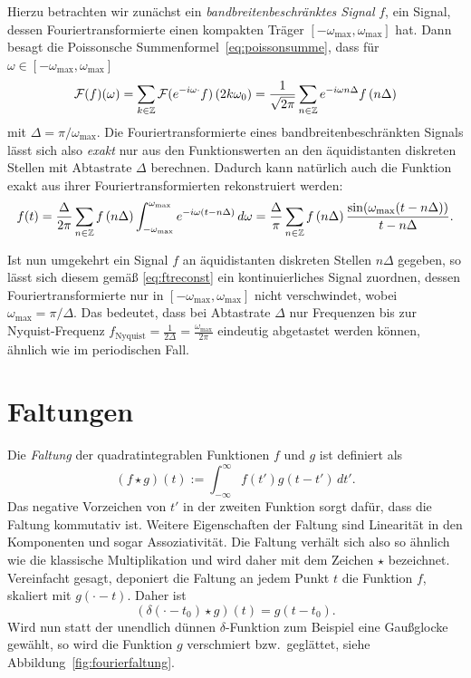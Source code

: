 Hierzu betrachten wir zunächst ein \emph{bandbreitenbeschränktes
  Signal} $f$, \dh ein Signal, dessen Fouriertransformierte einen
kompakten Träger $[-\omega_\text{max},\omega_\text{max}]$ hat. Dann besagt die
Poissonsche Summenformel~\eqref{eq:poissonsumme}, dass für
$\omega\in[-\omega_\text{max},\omega_\text{max}]$
\begin{equation}
  \mathcal F(f)(\omega) =
  \sum_{k\in\mathbb{Z}}\mathcal F(e^{-i\omega \cdot} f)\left(2k\omega_0\right)
  =
  \frac{1}{\sqrt{2\pi}}
  \sum_{n\in\mathbb{Z}} e^{-i \omega n \Delta}f\left(n \Delta\right)
\end{equation}
mit $\Delta=\pi/\omega_\text{max}$. Die Fouriertransformierte eines
bandbreitenbeschränkten Signals lässt sich also \emph{exakt} nur aus
den Funktionswerten an den äquidistanten diskreten Stellen mit
Abtastrate $\Delta$ berechnen. Dadurch kann natürlich auch die
Funktion exakt aus ihrer Fouriertransformierten rekonstruiert werden:
\begin{equation}
  \label{eq:ftreconst}
  f(t)
  = \frac{\Delta}{2\pi}\sum_{n\in\mathbb{Z}} f\left(n \Delta\right)
  \int_{-\omega_\text{max}}^{\omega_\text{max}} e^{-i \omega (t - n\Delta)} \,d\omega
  = \frac{\Delta}{\pi}\sum_{n\in\mathbb{Z}} f\left(n \Delta\right)
  \frac{\sin(\omega_\text{max}(t-n\Delta))}{t-n\Delta}.
\end{equation}

Ist nun umgekehrt ein Signal $f$ an äquidistanten diskreten Stellen
$n\Delta$ gegeben, so lässt sich diesem gemäß \eqref{eq:ftreconst} ein
kontinuierliches Signal zuordnen, dessen Fouriertransformierte nur in
$[-\omega_\text{max},\omega_\text{max}]$ nicht verschwindet, wobei $\omega_\text{max} =
\pi/\Delta$. Das bedeutet, dass bei Abtastrate $\Delta$ nur Frequenzen
bis zur Nyquist-Frequenz $f_\text{Nyquist}=\frac{1}{2\Delta} =
\frac{\omega_\text{max}}{2\pi}$ eindeutig abgetastet werden können, ähnlich wie
im periodischen Fall.

\section{Faltungen}

Die \emph{Faltung} der quadratintegrablen Funktionen $f$ und $g$ ist
definiert als
\begin{equation}
  (f \star g)(t) := \int_{-\infty}^{\infty} f(t')g(t-t')\,dt'.
\end{equation}
Das negative Vorzeichen von $t'$ in der zweiten Funktion sorgt
dafür, dass die Faltung kommutativ ist. Weitere Eigenschaften der
Faltung sind Linearität in den Komponenten und sogar
Assoziativität. Die Faltung verhält sich also so ähnlich wie die
klassische Multiplikation und wird daher mit dem Zeichen $\star$
bezeichnet.  Vereinfacht gesagt, deponiert die Faltung an jedem Punkt
$t$ die Funktion $f$, skaliert mit $g(\cdot - t) $. Daher ist \zb
\begin{equation}
  (\delta(\cdot - t_0) \star g)(t) = g(t - t_0).
\end{equation}
Wird nun statt der unendlich dünnen $\delta$-Funktion zum Beispiel
eine Gaußglocke gewählt, so wird die Funktion $g$ verschmiert
bzw.\ geglättet, siehe Abbildung~\ref{fig:fourierfaltung}.

